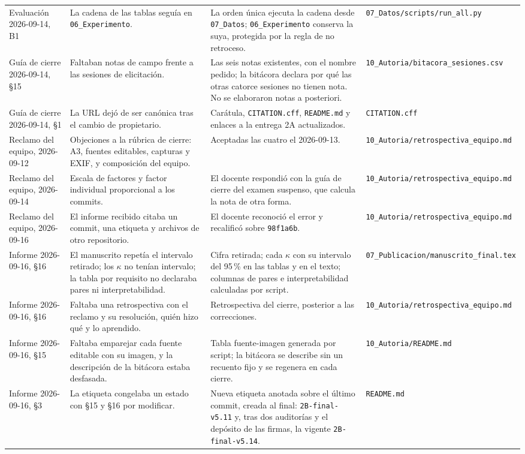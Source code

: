 \documentclass[11pt,a4paper]{article}
\begin{document}
{\begin{longtable}{p{2.1cm}p{3.9cm}p{4.9cm}p{3.3cm}}
Evaluaci\'on 2026-09-14, B1 & La cadena de las tablas segu\'ia en \texttt{06\_Experimento}. & La orden \'unica ejecuta la cadena desde \texttt{07\_Datos}; \texttt{06\_Experimento} conserva la suya, protegida por la regla de no retroceso. & \nolinkurl{07_Datos/scripts/run_all.py} \\
Gu\'ia de cierre 2026-09-14, \S15 & Faltaban notas de campo frente a las sesiones de elicitaci\'on. & Las seis notas existentes, con el nombre pedido; la bit\'acora declara por qu\'e las otras catorce sesiones no tienen nota. No se elaboraron notas a posteriori. & \nolinkurl{10_Autoria/bitacora_sesiones.csv} \\
Gu\'ia de cierre 2026-09-14, \S1 & La URL dej\'o de ser can\'onica tras el cambio de propietario. & Car\'atula, \texttt{CITATION.cff}, \texttt{README.md} y enlaces a la entrega 2A actualizados. & \nolinkurl{CITATION.cff} \\
Reclamo del equipo, 2026-09-12 & Objeciones a la r\'ubrica de cierre: A3, fuentes editables, capturas y EXIF, y composici\'on del equipo. & Aceptadas las cuatro el 2026-09-13. & \nolinkurl{10_Autoria/retrospectiva_equipo.md} \\
Reclamo del equipo, 2026-09-14 & Escala de factores y factor individual proporcional a los commits. & El docente respondi\'o con la gu\'ia de cierre del examen suspenso, que calcula la nota de otra forma. & \nolinkurl{10_Autoria/retrospectiva_equipo.md} \\
Reclamo del equipo, 2026-09-16 & El informe recibido citaba un commit, una etiqueta y archivos de otro repositorio. & El docente reconoci\'o el error y recalific\'o sobre \texttt{98f1a6b}. & \nolinkurl{10_Autoria/retrospectiva_equipo.md} \\
Informe 2026-09-16, \S16 & El manuscrito repet\'ia el intervalo retirado; los $\kappa$ no ten\'ian intervalo; la tabla por requisito no declaraba pares ni interpretabilidad. & Cifra retirada; cada $\kappa$ con su intervalo del 95\,\% en las tablas y en el texto; columnas de pares e interpretabilidad calculadas por script. & \nolinkurl{07_Publicacion/manuscrito_final.tex} \\
Informe 2026-09-16, \S16 & Faltaba una retrospectiva con el reclamo y su resoluci\'on, qui\'en hizo qu\'e y lo aprendido. & Retrospectiva del cierre, posterior a las correcciones. & \nolinkurl{10_Autoria/retrospectiva_equipo.md} \\
Informe 2026-09-16, \S15 & Faltaba emparejar cada fuente editable con su imagen, y la descripci\'on de la bit\'acora estaba desfasada. & Tabla fuente-imagen generada por script; la bit\'acora se describe sin un recuento fijo y se regenera en cada cierre. & \nolinkurl{10_Autoria/README.md} \\
Informe 2026-09-16, \S3 & La etiqueta congelaba un estado con \S15 y \S16 por modificar. & Nueva etiqueta anotada sobre el \'ultimo commit, creada al final: \texttt{2B-final-v5.11} y, tras dos auditor\'ias y el dep\'osito de las firmas, la vigente \texttt{2B-final-v5.14}. & \nolinkurl{README.md} \\
\bottomrule
\end{longtable}}
\end{document}
